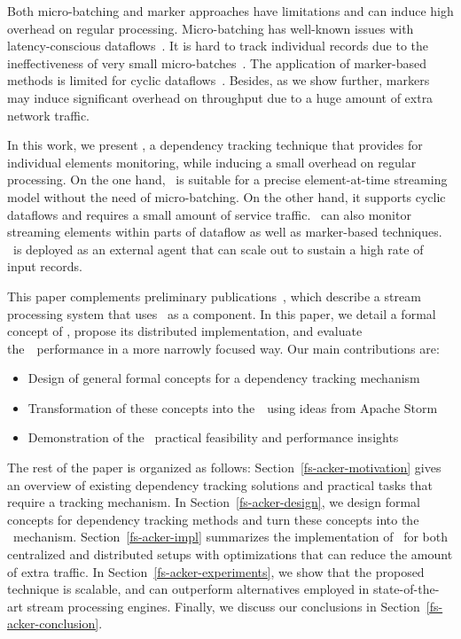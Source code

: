Both micro-batching and marker approaches have limitations and can induce high overhead on regular processing. Micro-batching has well-known issues with latency-conscious dataflows~\cite{S7530084}. It is hard to track individual records due to the ineffectiveness of very small micro-batches~\cite{Zaharia:2012:DSE:2342763.2342773}. The application of marker-based methods is limited for cyclic dataflows~\cite{Carbone:2017:SMA:3137765.3137777}. Besides, as we show further, markers may induce significant overhead on throughput due to a huge amount of extra network traffic.

In this work, we present \tracker , a dependency tracking technique that provides for individual elements monitoring, while inducing a small overhead on regular processing. On the one hand, \tracker\ is suitable for a precise element-at-time streaming model without the need of micro-batching. On the other hand, it supports cyclic dataflows and requires a small amount of service traffic. \tracker\ can also monitor streaming elements within parts of dataflow as well as marker-based techniques. \tracker\ is deployed as an external agent that can scale out to sustain a high rate of input records. 

This paper complements preliminary publications~\cite{we2018beyondmr, we2018adbis, thepaper}, which describe a stream processing system that uses \tracker\ as a component. In this paper, we detail a formal concept of \tracker , propose its distributed implementation, and evaluate the~\tracker\ performance in a more narrowly focused way. Our main contributions are:
\begin{itemize}
    \item Design of general formal concepts for a dependency tracking mechanism
    \item Transformation of these concepts into the~\tracker\ using ideas from Apache Storm {\em \acker}~\cite{Toshniwal:2014:STO:2588555.2595641}
    \item Demonstration of the \tracker\ practical feasibility and performance insights
\end{itemize}

The rest of the paper is organized as follows: Section~\ref{fs-acker-motivation} gives an overview of existing dependency tracking solutions and practical tasks that require a tracking mechanism. In Section~\ref{fs-acker-design}, we design formal concepts for dependency tracking methods and turn these concepts into the \tracker\ mechanism. Section~\ref{fs-acker-impl} summarizes the implementation of \tracker\ for both centralized and distributed setups with optimizations that can reduce the amount of extra traffic. In Section~\ref{fs-acker-experiments}, we show that the proposed technique is scalable, and can outperform alternatives employed in state-of-the-art stream processing engines. Finally, we discuss our conclusions in Section~\ref{fs-acker-conclusion}.